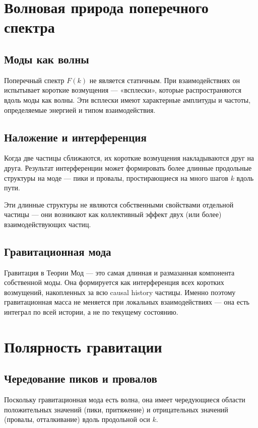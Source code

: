 \documentclass[12pt,a4paper]{article}
\begin{document}
\section{Волновая природа поперечного спектра}

\subsection{Моды как волны}
Поперечный спектр $F(k)$ не является статичным. При взаимодействиях он испытывает короткие возмущения --- «всплески», которые распространяются вдоль моды как волны. Эти всплески имеют характерные амплитуды и частоты, определяемые энергией и типом взаимодействия.

\subsection{Наложение и интерференция}
Когда две частицы сближаются, их короткие возмущения накладываются друг на друга. Результат интерференции может формировать более длинные продольные структуры на моде --- пики и провалы, простирающиеся на много шагов $k$ вдоль пути.

Эти длинные структуры не являются собственными свойствами отдельной частицы --- они возникают как коллективный эффект двух (или более) взаимодействующих частиц.

\subsection{Гравитационная мода}
Гравитация в Теории Мод --- это самая длинная и размазанная компонента собственной моды. Она формируется как интерференция всех коротких возмущений, накопленных за всю causal history частицы. Именно поэтому гравитационная масса не меняется при локальных взаимодействиях --- она есть интеграл по всей истории, а не по текущему состоянию.

\section{Полярность гравитации}

\subsection{Чередование пиков и провалов}
Поскольку гравитационная мода есть волна, она имеет чередующиеся области положительных значений (пики, притяжение) и отрицательных значений (провалы, отталкивание) вдоль продольной оси $k$.
\end{document}
